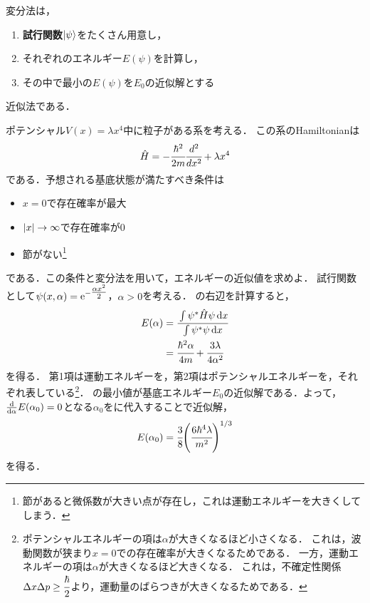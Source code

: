 \documentclass{report}
\begin{document}
  変分法は，
  \begin{screen}
    \begin{enumerate}
      \item \textbf{試行関数}$\ket{\psi}$をたくさん用意し，
      \item それぞれのエネルギー$E(\psi)$を計算し，
      \item その中で最小の$E(\psi)$を$E_0$の近似解とする
    \end{enumerate}
  \end{screen}
  近似法である．
  \begin{myex}{}{}
    ポテンシャル$V(x)=\lambda x^4$中に粒子がある系を考える．
    この系のHamiltonianは
    \begin{align}
      \hat{H} = -\cfrac{\hbar^2}{2m}\cfrac{d^2}{dx^2} + \lambda x^4
    \end{align}
    である．予想される基底状態が満たすべき条件は
    \begin{itemize}
      \item $x = 0$で存在確率が最大
      \item $\abs{x} \to \infty$で存在確率が0
      \item 節がない\footnote{節があると微係数が大きい点が存在し，これは運動エネルギーを大きくしてしまう．}
    \end{itemize}
    である．この条件と変分法を用いて，エネルギーの近似値を求めよ．
    \tcblower
    試行関数として$\psi(x,\alpha) = \mathrm{e}^{-\tfrac{\alpha x^2}{2}}$，$\alpha > 0$を考える．
    の右辺を計算すると，
    \begin{align}
      E(\alpha) &= \cfrac{\int \psi^{*}\hat{H}\psi \dd{x}}{\int \psi^{*}\psi \dd{x}} \label{E1} \\ 
      &= \cfrac{\hbar^2 \alpha}{4m} + \cfrac{3\lambda}{4\alpha^2}
    \end{align}
    を得る．
    第1項は運動エネルギーを，第2項はポテンシャルエネルギーを，それぞれ表している\footnote{
      ポテンシャルエネルギーの項は$\alpha$が大きくなるほど小さくなる．
      これは，波動関数が狭まり$x=0$での存在確率が大きくなるためである．
      一方，運動エネルギーの項は$\alpha$が大きくなるほど大きくなる．
      これは，不確定性関係$\Delta x\Delta p \ge \cfrac{\hbar}{2}$より，運動量のばらつきが大きくなるためである．
    }．
    の最小値が基底エネルギー$E_0$の近似解である．よって，$\dv{\alpha}E(\alpha_0) = 0$となる$\alpha_0$をに代入することで近似解，
    \begin{align}
      E(\alpha_0) = \cfrac{3}{8}\qty(\cfrac{6\hbar^4\lambda}{m^2})^{1/3}
    \end{align}
    を得る．
  \end{myex}
\end{document}
